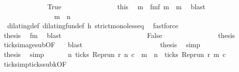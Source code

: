 \begin{isabellebody}
\ \ \ \ \ \ \ \ \ \ \ \ \isamarkupfalse%
\ True\isanewline
\ \ \ \ \ \ \ \ \ \ \ \ \ \ \isamarkupfalse%
\ this\ \isamarkupfalse%
\ m\ \ fm{}{\isacharcolon}{\isacartoucheopen}f\ m\ {\isacharequal}\ m{\isacartoucheclose}\ \isamarkupfalse%
\ blast\isanewline
\ \ \ \ \ \ \ \ \ \ \ \ \ \ \isamarkupfalse%
\ {\isacartoucheopen}m\ {\isasymge}\ n{\isacartoucheclose}\isanewline
\ \ \ \ \ \ \ \ \ \ \ \ \ \ \ \ \isamarkupfalse%
\ {\isacharasterisk}\ dilating{\isacharunderscore}def\ dilating{\isacharunderscore}fun{\isacharunderscore}def\ h\ strict{\isacharunderscore}mono{\isacharunderscore}less{\isacharunderscore}eq\ \isamarkupfalse%
\ fastforce\isanewline
\ \ \ \ \ \ \ \ \ \ \ \ \ \ \isamarkupfalse%
\ {}\ \isamarkupfalse%
\ {\isacharquery}thesis\ \isamarkupfalse%
\ fm{}\ \isamarkupfalse%
\ blast\isanewline
\ \ \ \ \ \ \ \ \ \ \isamarkupfalse%
\isanewline
\ \ \ \ \ \ \ \ \ \ \ \ \isamarkupfalse%
\ False\isanewline
\ \ \ \ \ \ \ \ \ \ \ \ \ \ \isamarkupfalse%
\ {\isacharquery}thesis\ \ \isamarkupfalse%
\ ticks{\isacharunderscore}image{\isacharunderscore}sub{\isacharprime}{\isacharbrackleft}OF\ {\isacharasterisk}{\isacharbrackright}\ \isamarkupfalse%
\ blast\isanewline
\ \ \ \ \ \ \ \ \ \ \isamarkupfalse%
\isanewline
\ \ \ \ \ \ \ \ \isacommand{{\isacharbraceright}}\isamarkupfalse%
\ \isamarkupfalse%
\ {\isacharquery}thesis\ \isamarkupfalse%
\ simp\isanewline
\ \ \ \ \ \ \isamarkupfalse%
\isanewline
\ \ \ \ \isacommand{{\isacharbraceright}}\isamarkupfalse%
\ \isamarkupfalse%
\ {\isacharquery}thesis\ \isamarkupfalse%
\ simp\isanewline
\ \ \isamarkupfalse%
\isanewline
\ \ \isamarkupfalse%
\ {\isacartoucheopen}{\isasymforall}n{\isachardot}\ ticks\ {\isacharparenleft}Rep{\isacharunderscore}run\ r\ n\ c\ {\isasymlongrightarrow}\ {\isacharparenleft}{\isasymforall}m\ {\isasymge}\ n{\isachardot}\ {\isasymnot}\ ticks\ {\isacharparenleft}Rep{\isacharunderscore}run\ r\ m\ c\isanewline
\ \ \ \ \isamarkupfalse%
\ ticks{\isacharunderscore}imp{\isacharunderscore}ticks{\isacharunderscore}subk{\isacharbrackleft}OF\ {\isacharasterisk}{\isacharbrackright}\ \isamarkupfalse%

\end{isabellebody}
